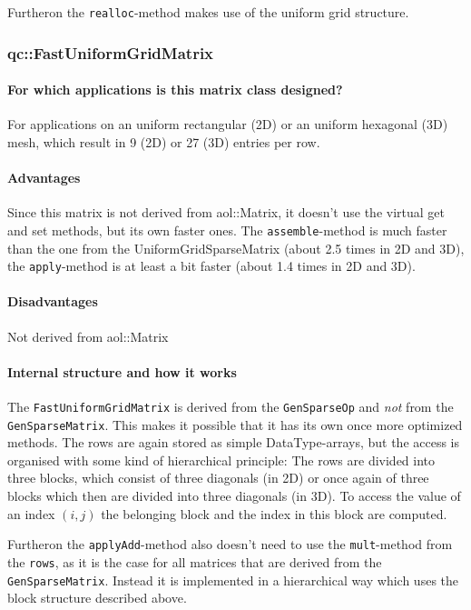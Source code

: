 Furtheron the \texttt{realloc}-method makes use of the uniform grid
structure.


\subsubsection{qc::FastUniformGridMatrix}
\paragraph{For which applications is this matrix class designed?}
For applications on an uniform rectangular (2D) or an uniform
hexagonal (3D) mesh, which result in 9 (2D) or 27 (3D) entries per
row.

\paragraph{Advantages}
Since this matrix is not derived from aol::Matrix, it doesn't use
the virtual get and set methods, but its own faster ones.
The \texttt{assemble}-method is much faster than the one from the
UniformGridSparseMatrix (about 2.5 times in 2D and 3D), the
\texttt{apply}-method is at least a bit faster (about 1.4 times in 2D
and 3D).

\paragraph{Disadvantages}
Not derived from aol::Matrix

\paragraph{Internal structure and how it works}
The \texttt{FastUniformGridMatrix} is derived from the
\texttt{GenSparseOp} and \textit{not} from the \texttt{GenSparseMatrix}.
This makes it possible that it has its own once more optimized
methods.  The rows are again stored as simple DataType-arrays, but the
access is organised with some kind of hierarchical principle: The rows
are divided into three blocks, which consist of three diagonals (in
2D) or once again of three blocks which then are divided into three
diagonals (in 3D). To access the value of an index $(i,j)$ the
belonging block and the index in this block are computed.

Furtheron the \texttt{applyAdd}-method also doesn't need to use the
\texttt{mult}-method from the \texttt{rows}, as it is the case for all
matrices that are derived from the \texttt{GenSparseMatrix}. Instead
it is implemented in a hierarchical way which uses the block structure
described above.

